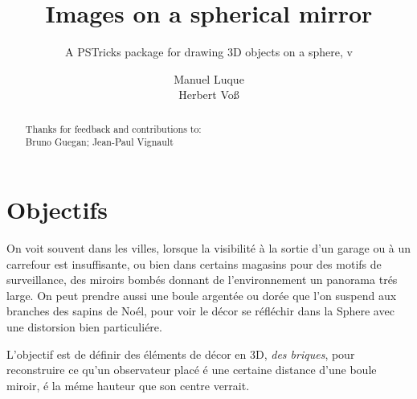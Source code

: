 \documentclass[fontsize=11pt,english,BCOR=10mm,DIV=12,bibliography=totoc,parskip=false,headings=small,
    headinclude=false,footinclude=false,oneside]{pst-doc}
\let\myFV\fileversion
\begin{document}
\author{Manuel Luque\\Herbert Vo\ss}
\docauthor{}
\title{Images on a spherical mirror}
\subtitle{A PSTricks package for drawing 3D objects on a sphere,  v\myFV}
\settitle

\tableofcontents

\clearpage
\begin{abstract}

\vfill\noindent
Thanks for feedback and contributions to:\\
Bruno Guegan; Jean-Paul Vignault
\end{abstract}


\section{Objectifs }
On voit souvent dans les villes, lorsque la visibilité à la sortie
d'un garage ou à un carrefour est insuffisante, ou bien
dans certains magasins pour des motifs de surveillance, des
miroirs bombés donnant de l'environnement un panorama trés large.
On peut prendre aussi une boule argentée ou dorée que l'on suspend
aux branches des sapins de Noél, pour voir le décor se réfléchir dans la Sphere
avec une distorsion bien particuliére.

L'objectif est de définir des éléments de décor en 3D, \textit{des
briques}, pour reconstruire ce qu'un observateur placé é une
certaine distance d'une boule miroir, é la méme hauteur que son
centre verrait.
\end{document}

